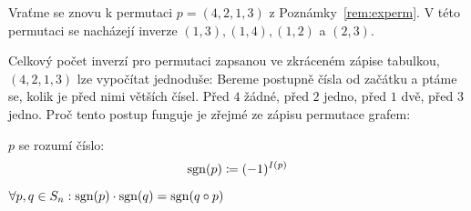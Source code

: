 \begin{remark}
    Vraťme se znovu k permutaci $p = (4,2,1,3)$ z Poznámky~\ref{rem:experm}. 
    V této permutaci se nacházejí inverze $(1,3), (1,4), (1,2)$ a $(2,3)$. 
    
    Celkový počet inverzí pro permutaci zapsanou ve zkráceném 
    zápise tabulkou, $(4,2,1, 3)$ lze vypočítat jednoduše: Bereme postupně 
    čísla od začátku a ptáme se, kolik je před nimi větších čísel. 
    Před $4$ žádné, před $2$ jedno, před $1$ dvě, před $3$ jedno. Proč tento
    postup funguje je zřejmé ze zápisu permutace grafem:
    \begin{center}
    \end{center}

\end{remark}

\begin{definition}
     $p$ se rozumí číslo: $$\mathop{\mathrm{sgn}}(p) \coloneqq
    (-1)^{I(p)}$$
\end{definition}

\begin{observation}
    $\forall p,q \in S_n: \mathop{\mathrm{sgn}}(p) \cdot \mathop{\mathrm{sgn}}(q) = \mathop{\mathrm{sgn}}(q \circ p)$
\end{observation}

